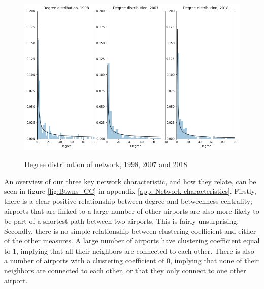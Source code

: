\begin{figure}[H]
  \centering
  \caption{Degree distribution of network, 1998, 2007 and 2018}
    \includegraphics[width=1 \textwidth]{Exam/Figures/degree_distribution.png}
  \label{fig:degree_distribution}
\end{figure}
An overview of our three key network characteristic, and how they relate, can be seen in figure \ref{fig:Btwns_CC} in appendix \ref{app: Network characteristics}. Firstly, there is a clear positive relationship between degree and betweenness centrality; airports that are linked to a large number of other airports are also more likely to be part of a shortest path between two airports. This is fairly unsurprising. Secondly, there is no simple relationship between clustering coefficient and either of the other measures. A large number of airports have clustering coefficient equal to 1, implying that all their neighbors are connected to each other. There is also a number of airports with a clustering coefficient of 0, implying that none of their neighbors are connected to each other, or that they only connect to one other airport. 


